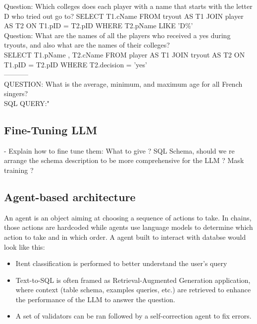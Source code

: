 \documentclass[12pt,a4paper]{article}
\begin{document}
Question: Which colleges does each player with a name that starts with the letter D  who tried out go to?
 SELECT T1.cName FROM  tryout AS T1 JOIN player AS T2 ON T1.pID  =  T2.pID WHERE T2.pName LIKE 'D\%'\\
Question: What are the names of all the players who received a yes during tryouts, and also what are the names of their colleges?\\
 SELECT T1.pName ,  T2.cName FROM player AS T1 JOIN tryout AS T2 ON T1.pID  =  T2.pID WHERE T2.decision  =  'yes'\\
-----------\\
QUESTION: What is the average, minimum, and maximum age for all French singers?\\
SQL QUERY:"\\
\subsection*{Fine-Tuning LLM}

- Explain how to fine tune them:
What to give ? SQL Schema, should we re arrange the schema description to be more comprehensive for the LLM ? Mask training ?

\subsection*{Agent-based architecture}

An agent is an object aiming at choosing a sequence of actions to take. In chains, those actions are hardcoded while agents use language models to determine which action to take and in which order. A agent built to interact with databse would look like this:

\begin{itemize}
    \item Itent classification is performed to better understand the user's query
    \item Text-to-SQL is often framed as Retrieval-Augmented Generation application, where context (table schema, examples queries, etc.) are retrieved to enhance the performance of the LLM to answer the question. 
    \item A set of validators can be ran followed by a self-correction agent to fix errors.
\end{itemize}
\end{document}
